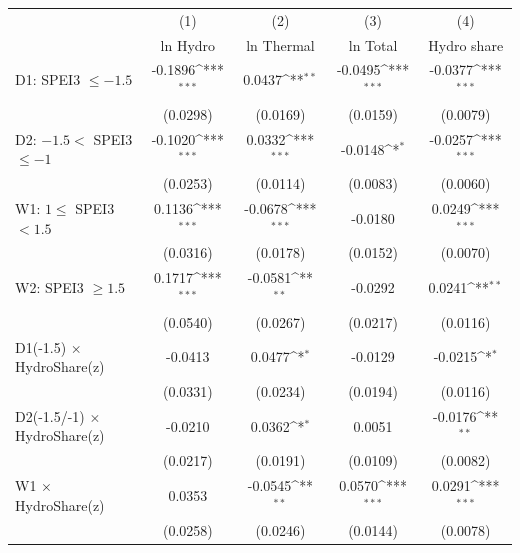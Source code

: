 {
\def\sym#1{\ifmmode^{#1}\else\(^{#1}\)\fi}
\begin{tabular}{l*{4}{c}}
\toprule
                    &\multicolumn{1}{c}{(1)}&\multicolumn{1}{c}{(2)}&\multicolumn{1}{c}{(3)}&\multicolumn{1}{c}{(4)}\\
                    &\multicolumn{1}{c}{ln Hydro}&\multicolumn{1}{c}{ln Thermal}&\multicolumn{1}{c}{ln Total}&\multicolumn{1}{c}{Hydro share}\\
\midrule
D1: SPEI3 $\leq -1.5$&     -0.1896\sym{***}&      0.0437\sym{**} &     -0.0495\sym{***}&     -0.0377\sym{***}\\
                    &    (0.0298)         &    (0.0169)         &    (0.0159)         &    (0.0079)         \\
\addlinespace
D2: $-1.5 <$ SPEI3 $\leq -1$&     -0.1020\sym{***}&      0.0332\sym{***}&     -0.0148\sym{*}  &     -0.0257\sym{***}\\
                    &    (0.0253)         &    (0.0114)         &    (0.0083)         &    (0.0060)         \\
\addlinespace
W1: $1 \leq$ SPEI3 $< 1.5$&      0.1136\sym{***}&     -0.0678\sym{***}&     -0.0180         &      0.0249\sym{***}\\
                    &    (0.0316)         &    (0.0178)         &    (0.0152)         &    (0.0070)         \\
\addlinespace
W2: SPEI3 $\geq 1.5$&      0.1717\sym{***}&     -0.0581\sym{**} &     -0.0292         &      0.0241\sym{**} \\
                    &    (0.0540)         &    (0.0267)         &    (0.0217)         &    (0.0116)         \\
\addlinespace
D1(-1.5) $\times$ HydroShare(z)&     -0.0413         &      0.0477\sym{*}  &     -0.0129         &     -0.0215\sym{*}  \\
                    &    (0.0331)         &    (0.0234)         &    (0.0194)         &    (0.0116)         \\
\addlinespace
D2(-1.5/-1) $\times$ HydroShare(z)&     -0.0210         &      0.0362\sym{*}  &      0.0051         &     -0.0176\sym{**} \\
                    &    (0.0217)         &    (0.0191)         &    (0.0109)         &    (0.0082)         \\
\addlinespace
W1 $\times$ HydroShare(z)&      0.0353         &     -0.0545\sym{**} &      0.0570\sym{***}&      0.0291\sym{***}\\
                    &    (0.0258)         &    (0.0246)         &    (0.0144)         &    (0.0078)         \\

\end{tabular}}
